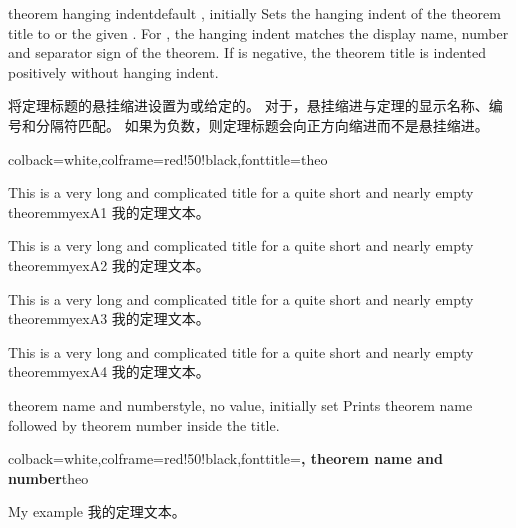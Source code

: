 \begin{docTcbKey}[][doc new=2020-10-21]{theorem hanging indent}{}{default , initially }
Sets the hanging indent of the theorem title to  or the
given .
For , the hanging indent matches the display name, number and
separator sign of the theorem.
If  is negative, the theorem title is indented positively
without hanging indent.

将定理标题的悬挂缩进设置为或给定的。 对于，悬挂缩进与定理的显示名称、编号和分隔符匹配。 如果为负数，则定理标题会向正方向缩进而不是悬挂缩进。
\begin{dispExample}
%
  {colback=white,colframe=red!50!black,fonttitle=\bfseries}{theo}

\begin{sometheorem}{This is a very long and complicated title for a quite
  short and nearly empty theorem}{myexA1}
我的定理文本。
\end{sometheorem}

\begin{sometheorem}[theorem hanging indent=5mm]{This is a very long and
  complicated title for a quite short and nearly empty theorem}{myexA2}
我的定理文本。
\end{sometheorem}

\begin{sometheorem}[theorem hanging indent=0pt]{This is a very long and
  complicated title for a quite short and nearly empty theorem}{myexA3}
我的定理文本。
\end{sometheorem}

\begin{sometheorem}[theorem hanging indent=-5mm]{This is a very long and
  complicated title for a quite short and nearly empty theorem}{myexA4}
我的定理文本。
\end{sometheorem}
\end{dispExample}
\end{docTcbKey}



\begin{docTcbKey}{theorem name and number}{}{style, no value, initially set}
Prints theorem name followed by theorem number inside the title.
\begin{dispExample}
%
  {colback=white,colframe=red!50!black,fonttitle=\bfseries,
   theorem name and number}{theo}
\begin{sometheorem}{My example}{}
我的定理文本。
\end{sometheorem}
\end{dispExample}
\end{docTcbKey}



